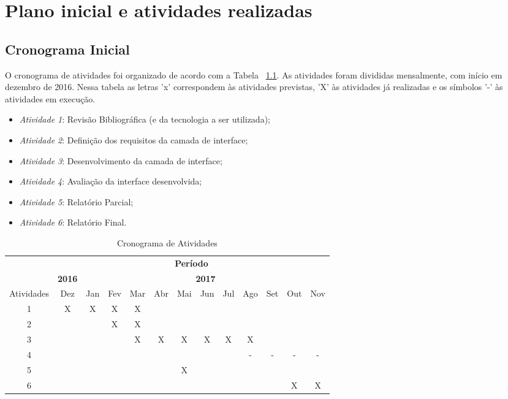 \chapter{Plano inicial e atividades realizadas}
\label{ch:plano_atividades}

\section{Cronograma Inicial}
O cronograma de atividades foi organizado de acordo com a Tabela ~\ref{tab_cronograma}. As atividades foram divididas mensalmente, com início em dezembro de 2016. Nessa tabela as letras 'x' correspondem às atividades previstas, 'X' às atividades já realizadas e os símbolos '-' às atividades em execução.

\begin{itemize}
\item \textit{Atividade 1}: Revisão Bibliográfica (e da tecnologia a ser utilizada);
\item \textit{Atividade 2}: Definição dos requisitos da camada de interface;
\item \textit{Atividade 3}: Desenvolvimento da camada de interface;
\item \textit{Atividade 4}: Avaliação da interface desenvolvida;
\item \textit{Atividade 5}: Relatório Parcial;
\item \textit{Atividade 6}: Relatório Final.

\end{itemize}


\begin{table}[htbp]
\centering 
\caption{Cronograma de Atividades}
\label{tab_cronograma}
\small
\begin{tabular}
{|c|c|c|c|c|c|c|c|c|c|c|c|c|} \cline{2-13}
\multicolumn{1}{c|}{}&\multicolumn{12}{c|}{\textbf{Período}}
 \\
\cline{2-13}
\multicolumn{1}{c|}{}&\multicolumn{1}{c|}{\textbf{2016}} &\multicolumn{11}{c|}{\textbf{2017}} \\
\hline Atividades & Dez & Jan & Fev & Mar & Abr & Mai & Jun & Jul & Ago & Set & Out & Nov \\
\hline         1  & X   & X   &  X  &  X  &     &     &     &     &     &     &     &     \\
\hline         2  &     &     &  X  &  X  &     &     &     &     &     &     &     &     \\
\hline         3  &     &     &     &  X  &  X  &  X  &  X  &  X  &  X  &     &     &     \\
\hline         4  &     &     &     &     &     &     &     &     &  -  &  -  &  -  &  -  \\
\hline         5  &     &     &     &     &     &  X  &     &     &     &     &     &     \\
\hline         6  &     &     &     &     &     &     &     &     &     &     &  X  &  X  \\
\hline
\end{tabular}
\normalsize
\end{table}

